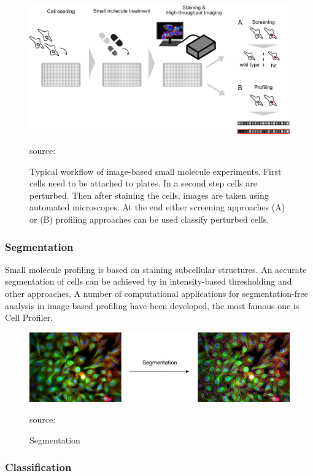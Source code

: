 \begin{figure}[H]
	\centering
	\includegraphics[width=0.8\linewidth]{bilder/cells/hcu.png}
	\caption{Typical workflow of image-based small molecule experiments. First cells need to be attached to plates. In a second step cells are perturbed. Then after staining the cells, images are taken using automated microscopes. At the end either screening approaches (A) or (B) profiling approaches can be used classify perturbed cells.}
	 source:\cite{Component}
	\label{fig:COMPONENT}
\end{figure}

\subsubsection{Segmentation}

Small molecule profiling is based on staining subcellular structures.
An accurate segmentation of cells can be achieved by in intensity-based thresholding and other approaches. A number of computational applications for segmentation-free analysis in image-based profiling have been developed, the most famous one is Cell Profiler.


\begin{figure}[H]
	\centering
	\includegraphics[width=0.8\linewidth]{bilder/cells/segmentation.png}
	\caption{Segmentation}
	source:\cite{Component}
	\label{fig:COMPONENT}
\end{figure}


\subsubsection{Classification}



